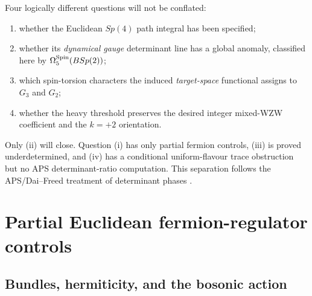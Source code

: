 \documentclass[11pt]{article}
\theoremstyle{definition}
\theoremstyle{remark}
\begin{document}
Four logically different questions will not be conflated:
\begin{enumerate}[label=(\roman*)]
\item whether the Euclidean \(Sp(4)\) path integral has been specified;
\item whether its \emph{dynamical gauge} determinant line has a global
  anomaly, classified here by \(\Omega^{\rm Spin}_5(BSp(2))\);
\item which spin-torsion characters the induced \emph{target-space}
  functional assigns to \(G_3\) and \(G_2\);
\item whether the heavy threshold preserves the desired integer mixed-WZW
  coefficient and the \(k=+2\) orientation.
\end{enumerate}
Only (ii) will close.  Question (i) has only partial fermion controls,
(iii) is proved underdetermined, and (iv) has a conditional uniform-flavour
trace obstruction but no APS determinant-ratio computation.  This separation follows the
APS/Dai--Freed treatment of determinant phases
\cite{AtiyahPatodiSinger1975,DaiFreed1994,WittenYonekura2019}.

\section{Partial Euclidean fermion-regulator controls}

\subsection{Bundles, hermiticity, and the bosonic action}
\end{document}

